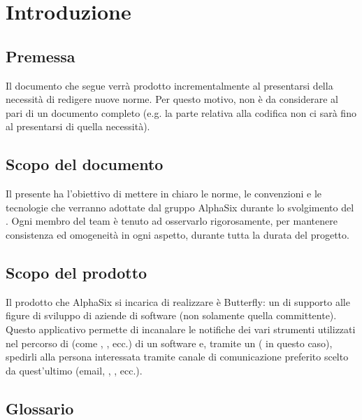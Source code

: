 \section{Introduzione}

\subsection{Premessa}
    Il documento che segue verrà prodotto incrementalmente al presentarsi della necessità di redigere nuove norme.
    Per questo motivo, non è da considerare al pari di un documento completo (e.g. la parte relativa alla codifica non ci sarà fino
    al presentarsi di quella necessità).

\subsection{Scopo del documento}
    Il presente  ha l’obiettivo di mettere in chiaro le norme, le convenzioni e le tecnologie
    che verranno adottate dal gruppo AlphaSix durante lo svolgimento del . Ogni membro del team
    \`e tenuto ad osservarlo rigorosamente, per mantenere consistenza ed omogeneit\`a in ogni aspetto, durante tutta la durata del progetto.\par

 \subsection{Scopo del prodotto}
 	Il prodotto che AlphaSix si incarica di realizzare è Butterfly: un  di supporto alle figure di	sviluppo di aziende di software (non solamente quella committente). Questo applicativo permette di incanalare le notifiche dei vari strumenti utilizzati nel percorso di  (come , , ecc.) di un software e, tramite un  ( in questo caso), spedirli alla persona interessata tramite canale di comunicazione preferito scelto da quest’ultimo (email, , , ecc.).

\subsection{Glossario}


